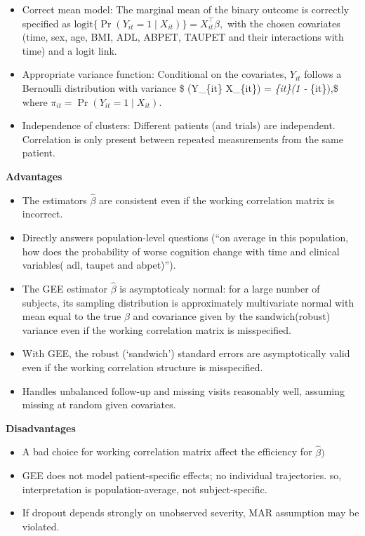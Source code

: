 \documentclass[
  11pt,
  letterpaper,
  DIV=11,
  numbers=noendperiod]{scrartcl}
\providecommand{\tightlist}{%
  \setlength{\itemsep}{0pt}\setlength{\parskip}{0pt}}\usepackage{longtable,booktabs,array}
\begin{document}
\begin{itemize}
\item
  Correct mean model: The marginal mean of the binary outcome is
  correctly specified as
  \(\text{logit}\{\Pr(Y_{it} = 1 \mid X_{it})\} = X_{it}^\top \beta,\)
  with the chosen covariates (time, sex, age, BMI, ADL, ABPET, TAUPET
  and their interactions with time) and a logit link.
\item
  Appropriate variance function: Conditional on the covariates,
  \(Y_{it}\) follows a Bernoulli distribution with variance \$
  (Y\_\{it\} \mid X\_\{it\}) = \pi\emph{\{it\}\bigl(1
  - \pi}\{it\}\bigr),\$ where
  \(\pi_{it} = \Pr(Y_{it} = 1 \mid X_{it})\).
\item
  Independence of clusters: Different patients (and trials) are
  independent. Correlation is only present between repeated measurements
  from the same patient.
\end{itemize}

\textbf{Advantages}

\begin{itemize}
\tightlist
\item
  The estimators \(\hat{\beta}\) are consistent even if the working
  correlation matrix is incorrect.
\item
  Directly answers population-level questions (``on average in this
  population, how does the probability of worse cognition change with
  time and clinical variables( adl, taupet and abpet)'').
\item
  The GEE estimator \(\hat{\beta}\) is asymptoticaly normal: for a large
  number of subjects, its sampling distribution is approximately
  multivariate normal with mean equal to the true \({\beta}\) and
  covariance given by the sandwich(robust) variance even if the working
  correlation matrix is misspecified.
\item
  With GEE, the robust (`sandwich') standard errors are asymptotically
  valid even if the working correlation structure is misspecified.
\item
  Handles unbalanced follow-up and missing visits reasonably well,
  assuming missing at random given covariates.
\end{itemize}

\textbf{Disadvantages}

\begin{itemize}
\tightlist
\item
  A bad choice for working correlation matrix affect the efficiency for
  \(\hat{\beta})\)
\item
  GEE does not model patient-specific effects; no individual
  trajectories. so, interpretation is population-average, not
  subject-specific.
\item
  If dropout depends strongly on unobserved severity, MAR assumption may
  be violated.
\end{itemize}
\end{document}
